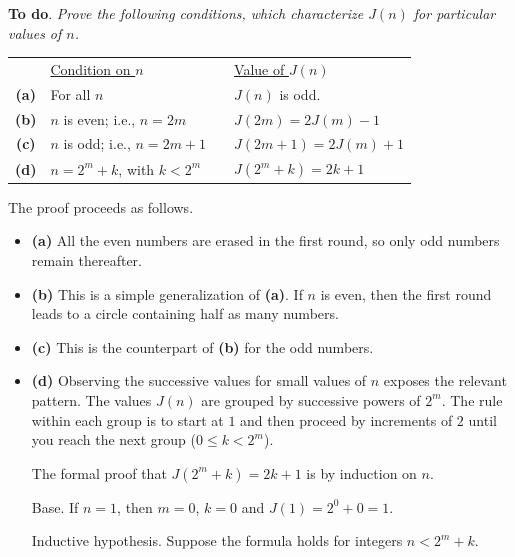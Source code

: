 \begin{itemize}
\medskip

{\bf To do}. {\em Prove the following conditions, which characterize $J(n)$ for particular values of $n$.}
\smallskip

\hspace*{.25in}
\begin{tabular}{clll}
 & \underline{Condition on $n$} & \hspace*{.1in} & \underline{Value of $J(n)$} \\ 
{\bf (a)} &
For all $n$ &  & $J(n)$ is odd. \\
{\bf (b)} &
$n$ is even; i.e., $n = 2m$ & & $J(2m) = 2J(m)-1$ \\
{\bf (c)} &
$n$ is odd; i.e., $n = 2m+1$ & & $J(2m+1) = 2J(m)+1$ \\
{\bf (d)} &
$n = 2^m+k$, with $k < 2^m$ & & $J(2^m+k) = 2k+1$
\end{tabular}

\smallskip

The proof proceeds as follows.
\begin{itemize}
\item {\bf (a)} 
All the even numbers are erased in the first round, so only odd numbers remain thereafter.

\medskip
\item {\bf (b)} 
This is a simple generalization of {\bf (a)}.  If $n$ is even, then the first round leads to a circle containing half as many numbers. 

\medskip
\item {\bf (c)} 
This is the counterpart of {\bf (b)} for the odd numbers.

\medskip
\item {\bf (d)} 
Observing the successive values for small values of $n$ exposes the relevant pattern.
The values $J(n)$ are grouped by successive powers of $2^m$.  The rule within each group is to start at $1$ and then proceed by increments of $2$ until you reach the next group
($0 \leq k < 2^m$).

\medskip

The formal proof that $J(2^m+k) = 2k+1$ is by induction on $n$.

\smallskip

{\sf Base}.
If $n=1$, then $m=0$, $k=0$ and $J(1) = 2^0+0 = 1$.

\smallskip
 
{\sf Inductive hypothesis}.
Suppose the formula holds for integers $n < 2^m+k$.
\smallskip


\end{itemize}
\end{itemize}
